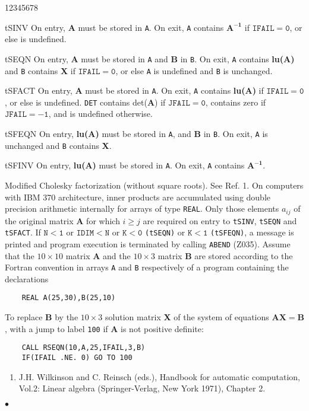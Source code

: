 \begin{DLtt}{12345678}
\item [tSINV] On entry, {\bf A} must be stored in {\tt A}. On exit,
{\tt A} contains $\mathbf{A^{-1}}$ if $\mathtt{IFAIL = 0}$, or else is
undefined.
\item [tSEQN] On entry, {\bf A} must be stored in {\tt A} and {\bf B}
in {\tt B}. On exit, {\tt A} contains {\bf lu(A)} and {\tt B} contains
{\bf X} if $\mathtt{IFAIL = 0}$, or else {\tt A} is undefined and {\tt B}
is unchanged.
\item [tSFACT] On entry, {\bf A} must be stored in {\tt A}. On exit,
{\tt A} contains {\bf lu(A)} if $\mathtt{IFAIL = 0}$, or else is undefined.
{\tt DET} contains det({\bf A}) if $\mathtt{JFAIL = 0}$, contains zero if
$\mathtt{JFAIL = -1}$, and is undefined otherwise.
\item [tSFEQN] On entry, {\bf lu(A)} must be stored in {\tt A}, and
{\bf B} in {\tt B}. On exit, {\tt A} is unchanged and {\tt B} contains
{\bf X}.
\item [tSFINV] On entry, {\bf lu(A)} must be stored in {\tt A}.
On exit, {\tt A} contains $\mathbf{A^{-1}}$.
\end{DLtt}
\Method
Modified Cholesky factorization (without square roots). See Ref. 1.
\Accuracy
On computers with IBM 370 architecture, inner products are accumulated
using double precision arithmetic internally for arrays of type
{\tt REAL}.
\Notes
Only those elements $a_{ij}$ of the original matrix {\bf A} for which
$i \geq j$ are required on entry to {\tt tSINV}, {\tt tSEQN}
and {\tt tSFACT}.
\Errorh
If $\mathtt{N<1}$ or $\mathtt{IDIM<N}$ or $\mathtt{K<0}$ {\tt (tSEQN)}
or $\mathtt{K < 1}$ {\tt (tSFEQN)}, a message is printed and program
execution is terminated by calling {\tt ABEND} (Z035).
\Examples
Assume that the $10 \times 10$ matrix {\bf A} and the $10 \times 3$
matrix {\bf B} are stored according to the Fortran convention in
arrays {\tt A} and {\tt B} respectively of a program containing the
declarations
\begin{verbatim}
    REAL A(25,30),B(25,10)
\end{verbatim}
To replace {\bf B} by the $10 \times 3$ solution matrix {\bf X} of the
system of equations $\mathbf{AX=B}$, with a jump to label {\tt 100} if
{\bf A} is not positive definite:
\begin{verbatim}
    CALL RSEQN(10,A,25,IFAIL,3,B)
    IF(IFAIL .NE. 0) GO TO 100
\end{verbatim}
\Refer
\begin{enumerate}
\item J.H. Wilkinson  and C. Reinsch (eds.), Handbook for
automatic computation, Vol.2: Linear algebra (Springer-Verlag,
New York 1971), Chapter 2.
\end{enumerate}
$\bullet$

